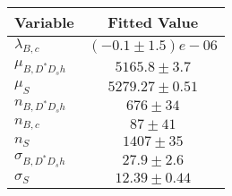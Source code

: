 \begin{tabular}[t]{lc}
\hline
Variable &Fitted Value\\
\hline\hline
$\lambda_{B,c}$&$(-0.1\pm1.5)e-06$\\
\hline
$\mu_{B, D^* D_s h}$&$5165.8\pm3.7$\\
\hline
$\mu_S$&$5279.27\pm0.51$\\
\hline
$n_{B, D^* D_s h}$&$676\pm34$\\
\hline
$n_{B,c}$&$87\pm41$\\
\hline
$n_S$&$1407\pm35$\\
\hline
$\sigma_{B, D^* D_s h}$&$27.9\pm2.6$\\
\hline
$\sigma_S$&$12.39\pm0.44$\\
\hline
\end{tabular}